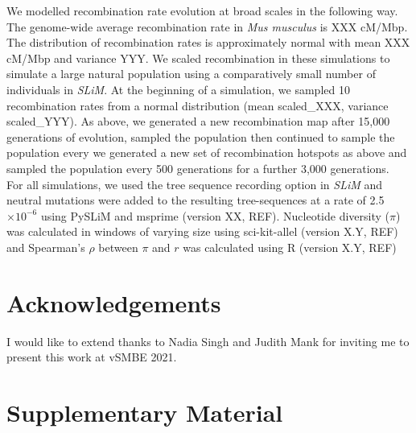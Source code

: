 \documentclass[10pt,twoside, twocolumn]{GSA_format}
\newcommand{\beginsupplement}{%
        \setcounter{table}{0}
        \renewcommand{\thetable}{S\arabic{table}}%
        \setcounter{figure}{0}
        \renewcommand{\thefigure}{S\arabic{figure}}%
     }
\begin{document}
We modelled recombination rate evolution at broad scales in the following way. The genome-wide average recombination rate in \textit{Mus musculus} is XXX cM/Mbp. The distribution of recombination rates is approximately normal with mean XXX cM/Mbp and variance YYY. We scaled recombination in these simulations to simulate a large natural population using a comparatively small number of individuals in \textit{SLiM}. At the beginning of a simulation, we sampled  10 recombination rates from a normal distribution (mean scaled\_XXX, variance scaled\_YYY). As above, we generated a new recombination map after 15,000 generations of evolution, sampled the population then continued to sample the population every 
we generated a new set of recombination hotspots as above and sampled the population every 500 generations for a further 3,000 generations. \\

For all simulations, we used the tree sequence recording option in \textit{SLiM} and neutral mutations were added to the resulting tree-sequences at a rate of 2.5$\times10^{-6}$ using PySLiM and msprime (version XX, REF). Nucleotide diversity ($\pi$) was calculated in windows of varying size using sci-kit-allel (version X.Y, REF) and Spearman's $\rho$ between $\pi$ and $r$ was calculated using R (version X.Y, REF)



\section{Acknowledgements}

I would like to extend thanks to Nadia Singh and Judith Mank for inviting me to present this work at vSMBE 2021.

\beginsupplement

\onecolumn 

\section{Supplementary Material}
\end{document}
